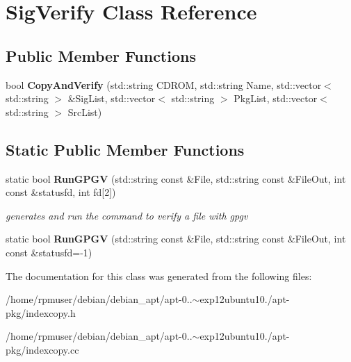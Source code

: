 \section{\-Sig\-Verify \-Class \-Reference}
\label{classSigVerify}
\subsection*{\-Public \-Member \-Functions}
\begin{DoxyCompactItemize}
\item 
bool {\bfseries \-Copy\-And\-Verify} (std\-::string \-C\-D\-R\-O\-M, std\-::string \-Name, std\-::vector$<$ std\-::string $>$ \&\-Sig\-List, std\-::vector$<$ std\-::string $>$ \-Pkg\-List, std\-::vector$<$ std\-::string $>$ \-Src\-List)\label{classSigVerify_a490c2d5199afc84532e9d4a41f2de667}

\end{DoxyCompactItemize}
\subsection*{\-Static \-Public \-Member \-Functions}
\begin{DoxyCompactItemize}
\item 
static bool {\bf \-Run\-G\-P\-G\-V} (std\-::string const \&\-File, std\-::string const \&\-File\-Out, int const \&statusfd, int fd[2])\label{classSigVerify_acc0acd48c59a36ea78d6bb047e37b2c5}

\begin{DoxyCompactList}\small\item\em generates and run the command to verify a file with gpgv \end{DoxyCompactList}\item 
static bool {\bfseries \-Run\-G\-P\-G\-V} (std\-::string const \&\-File, std\-::string const \&\-File\-Out, int const \&statusfd=-\/1)\label{classSigVerify_a05ee63ec6903fbe86e1e4d3ee28aabd6}

\end{DoxyCompactItemize}


\-The documentation for this class was generated from the following files\-:\begin{DoxyCompactItemize}
\item 
/home/rpmuser/debian/debian\-\_\-apt/apt-\/0..$\sim$exp12ubuntu10./apt-\/pkg/indexcopy.\-h\item 
/home/rpmuser/debian/debian\-\_\-apt/apt-\/0..$\sim$exp12ubuntu10./apt-\/pkg/indexcopy.\-cc\end{DoxyCompactItemize}
